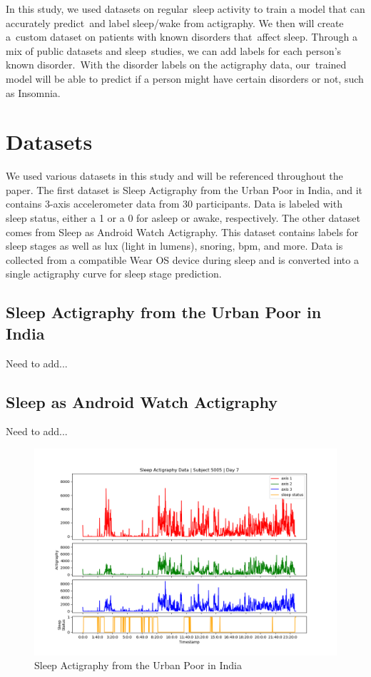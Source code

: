 \documentclass[12pt]{report}
\begin{document}
In this study, we used datasets on regular sleep activity to train a model that can accurately predict and label sleep/wake from actigraphy. We then will create a custom dataset on patients with known disorders that affect sleep. Through a mix of public datasets and sleep studies, we can add labels for each person's known disorder. With the disorder labels on the actigraphy data, our trained model will be able to predict if a person might have certain disorders or not, such as Insomnia.

\pagebreak

\section{Datasets}

We used various datasets in this study and will be referenced throughout the paper. The first dataset is Sleep Actigraphy from the Urban Poor in India, and it contains 3-axis accelerometer data from 30 participants. Data is labeled with sleep status, either a 1 or a 0 for asleep or awake, respectively. The other dataset comes from Sleep as Android Watch Actigraphy. This dataset contains labels for sleep stages as well as lux (light in lumens), snoring, bpm, and more. Data is collected from a compatible Wear OS device during sleep and is converted into a single actigraphy curve for sleep stage prediction.

\subsection{Sleep Actigraphy from the Urban Poor in India}
Need to add...

\subsection{Sleep as Android Watch Actigraphy}
Need to add...

\pagebreak

\begin{figure}
  \begin{center}
    \includegraphics[width=1\linewidth]{model_test_subject5005_day7}
    \caption{Sleep Actigraphy from the Urban Poor in India\cite{zhang}\cite{bessone}}
    \label{urban-poor}
  \end{center}
\end{figure}
\end{document}
